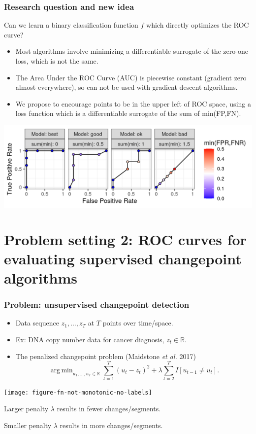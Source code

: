\documentclass[t]{beamer}
\DeclareMathOperator*{\argmin}{arg\,min}
\begin{document}
\begin{frame}
  \frametitle{Research question and new idea}
  Can we learn a binary classification function $f$ which directly
  optimizes the ROC curve?
  \begin{itemize}
  \item Most algorithms involve minimizing a differentiable surrogate
    of the zero-one loss, which is not the same.
  \item The Area Under the ROC Curve (AUC) is piecewise constant
    (gradient zero almost everywhere), so can not be used with
    gradient descent algorithms.
  \item We propose to encourage points to be in the upper left of ROC
    space, using a loss function which is a differentiable surrogate
    of the sum of min(FP,FN).
  \end{itemize}
  \includegraphics[width=\textwidth]{figure-more-than-one-binary-dots}
\end{frame}
 
\section{Problem setting 2: ROC curves for evaluating supervised changepoint algorithms}

\begin{frame}
  \frametitle{Problem: unsupervised changepoint detection}
  \begin{itemize}
  \item Data sequence $z_1,\dots,z_T$ at $T$ points over time/space.
  \item Ex: DNA copy number data for cancer diagnosis, $z_t\in\mathbb R$.
  \item The penalized changepoint problem (Maidstone \emph{et al.} 2017)
$$\argmin_{u_1,\dots,u_T\in\mathbb R} \sum_{t=1}^T (u_t - z_t)^2 + \lambda\sum_{t=2}^T I[u_{t-1} \neq u_t].$$
  \end{itemize}

  \parbox{0.6\textwidth}{
\texttt{[image: figure-fn-not-monotonic-no-labels]}
}
\parbox{0.3\textwidth}{
  Larger penalty $\lambda$ results in fewer changes/segments.

  \vskip 0.5in

  Smaller penalty $\lambda$ results in more changes/segments.
}

\end{frame}
\end{document}
